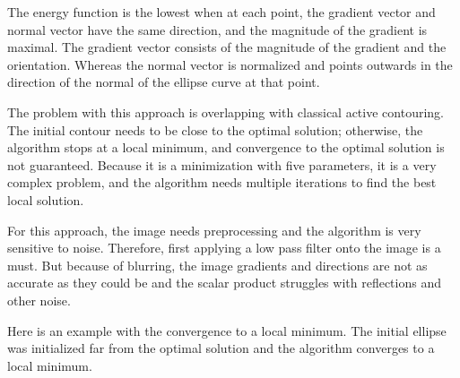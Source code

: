 The energy function is the lowest when at each point, the gradient vector and normal vector have the same direction, and the magnitude of the gradient is maximal. The gradient vector consists of the magnitude of the gradient and the orientation. Whereas the normal vector is normalized and points outwards in the direction of the normal of the ellipse curve at that point. 

The problem with this approach is overlapping with classical active contouring. The initial contour needs to be close to the optimal solution; otherwise, the algorithm stops at a local minimum, and convergence to the optimal solution is not guaranteed. Because it is a minimization with five parameters, it is a very complex problem, and the algorithm needs multiple iterations to find the best local solution. 

For this approach, the image needs preprocessing and the algorithm is very sensitive to noise. Therefore, first applying a low pass filter onto the image is a must. But because of blurring, the image gradients and directions are not as accurate as they could be and the scalar product struggles with reflections and other noise.

Here is an example with the convergence to a local minimum. The initial ellipse was initialized far from the optimal solution and the algorithm converges to a local minimum. 

